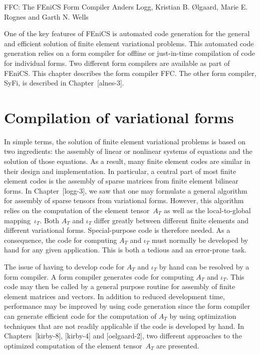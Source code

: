               {FFC: The FEniCS Form Compiler}
              {Anders Logg, Kristian B. \O{}lgaard, Marie E. Rognes and Garth N. Wells}


\renewcommand{\dolfin}{DOLFIN}
\newcommand{\ferari}{FErari}
\newcommand{\pythonlang}{Python}
\newcommand{\commandline}[1]{\medskip\noindent\framebox[\textwidth][l]{\texttt{#1}}\medskip}

One of the key features of FEniCS is automated code generation for the
general and efficient solution of finite element variational
problems. This automated code generation relies on a form compiler for
offline or just-in-time compilation of code for individual forms. Two
different form compilers are available as part of FEniCS. This chapter
describes the form compiler FFC. The other form compiler, SyFi, is
described in Chapter~[alnes-3].

\section{Compilation of variational forms}

In simple terms, the solution of finite element variational problems
is based on two ingredients: the assembly of linear or nonlinear
systems of equations and the solution of those equations. As a result,
many finite element codes are similar in their design and
implementation. In particular, a central part of most finite element
codes is the assembly of sparse matrices from finite element bilinear
forms. In Chapter~[logg-3], we saw that one may formulate a general
algorithm for assembly of sparse tensors from variational
forms. However, this algorithm relies on the computation of the
element tensor~$A_T$ as well as the local-to-global mapping~$\iota_T$.
Both $A_T$ and $\iota_T$ differ greatly between different finite
elements and different variational forms. Special-purpose code is
therefore needed. As a consequence, the code for computing $A_T$ and
$\iota_T$ must normally be developed by hand for any given
application. This is both a tedious and an error-prone task.

The issue of having to develop code for $A_T$ and $\iota_T$ by hand
can be resolved by a form compiler. A form compiler generates code for
computing $A_T$ and $\iota_T$. This code may then be called by a
general purpose routine for assembly of finite element matrices and
vectors. In addition to reduced development time, performance may be
improved by using code generation since the form compiler can generate
efficient code for the computation of $A_T$ by using optimization
techniques that are not readily applicable if the code is developed by
hand. In Chapters~[kirby-8], [kirby-4] and [oelgaard-2], two different
approaches to the optimized computation of the element tensor~$A_T$
are presented.

